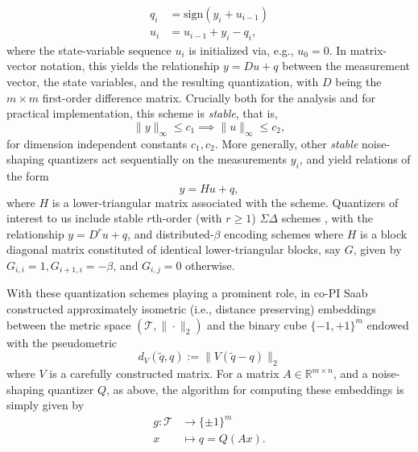 \documentclass{article}
\newcommand{\R}{\mathbb{R}}
\newcommand{\sign}{\mathrm{sign}}
\begin{document}
\begin{align}
    q_i &= \sign(y_i+u_{i-1})\\
    u_i &= u_{i-1} + y_i -q_i,
\end{align}
where the state-variable sequence $u_i$ is initialized via, e.g., $u_0=0$. In matrix-vector notation, this yields the relationship $y=Du+q$  between the measurement vector, the state variables, and the resulting quantization, with $D$ being the $m\times m$ first-order difference matrix. Crucially both for the analysis and for practical implementation, this scheme is \emph{stable}, that is, $$\|y\|_\infty \leq c_1 \implies \|u\|_\infty \leq c_2,$$ for dimension independent constants $c_1,c_2$. More generally, other \emph{stable} noise-shaping quantizers act sequentially on the measurements $y_i$, %
and yield relations of the form 
$$ y=Hu + q,$$ where $H$ is a lower-triangular matrix associated with the scheme. Quantizers of interest to us include
stable $r$th-order (with $r\geq 1$) $\Sigma\Delta$ schemes  \cite{}, with the relationship $y=D^r u+q$, and distributed-$\beta$ encoding schemes \cite{} where $H$ is a block diagonal matrix constituted of identical lower-triangular blocks, say $G$, given by $G_{i,i}=1, G_{i+1,i}=-\beta$, and $G_{i,j}=0$ otherwise.

With these quantization schemes playing a prominent role, in  \cite{huynh2018fast} co-PI Saab  constructed approximately isometric (i.e., distance preserving) embeddings between the metric space  $(\mathcal{T}, \|\cdot\|_2)$ and the binary  cube $\{-1,+1\}^m$ endowed with the pseudometric
$$d_{{V}}(\tilde{q},q) := \| {V}(\tilde{q} -{q}) \|_2$$
where $V$ is a carefully constructed matrix.
For a  matrix $A\in\R^{m\times n}$, and a noise-shaping quantizer $Q$, as above, the algorithm for computing these embeddings is simply given by \begin{align}
g: \mathcal{T} &\to \{\pm 1\}^m\nonumber\\
x &\mapsto q=Q(Ax).\nonumber
\end{align}
\end{document}
